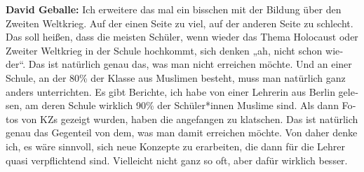\begin{otherlanguage}{ngerman}
\textbf{David Geballe:} Ich erweitere das mal ein bisschen mit der Bildung über den Zweiten Weltkrieg. Auf der einen Seite zu viel, auf der anderen Seite zu schlecht. Das soll heißen, dass die meisten Schüler, wenn wieder das Thema Holocaust oder Zweiter Weltkrieg in der Schule hochkommt, sich denken „ah, nicht schon wieder“. Das ist natürlich genau das, was man nicht erreichen möchte. Und an einer Schule, an der 80\% der Klasse aus Muslimen besteht, muss man natürlich ganz anders unterrichten. Es gibt Berichte, ich habe von einer Lehrerin aus Berlin gelesen, am deren Schule wirklich 90\% der Schüler*innen Muslime sind. Als dann Fotos von KZs gezeigt wurden, haben die angefangen zu klatschen. Das ist natürlich genau das Gegenteil von dem, was man damit erreichen möchte. Von daher denke ich, es wäre sinnvoll, sich neue Konzepte zu erarbeiten, die dann für die Lehrer quasi verpflichtend sind. Vielleicht nicht ganz so oft, aber dafür wirklich besser. 





\end{otherlanguage}
